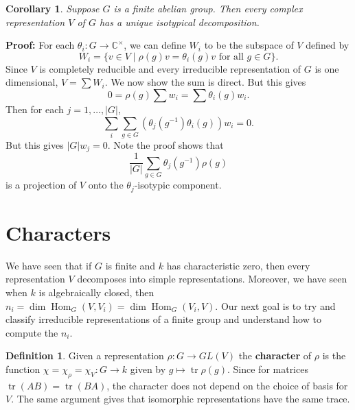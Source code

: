 \documentclass[12pt]{article}
\DeclareMathOperator{\tr}{tr}
\DeclareMathOperator{\Hom}{Hom}
\newtheorem{corollary}{Corollary}[section]
\theoremstyle{definition}
\newtheorem{definition}{Definition}[section]
\theoremstyle{remark}
\begin{document}
\begin{corollary}
	Suppose $G$ is a finite abelian group. Then every complex representation $V$ of $G$ has a unique isotypical decomposition.
\end{corollary}

\begin{adjustbox}{minipage = \columnwidth - 25.5pt, margin=1em, frame=1pt, margin=0em}
\textbf{Proof:} For each $\theta_i : G \to \mathbb{C}^{\times}$, we can define $W_i$ to be the subspace of $V$ defined by
\[
	W_i = \{v \in V \mid \rho(g)v = \theta_i(g)v \text{ for all } g \in G\}
.\]
Since $V$ is completely reducible and every irreducible representation of $G$ is one dimensional, $V = \sum W_i$. We now show the sum is direct. But this gives
\[
	0 = \rho(g) \sum w_i = \sum \theta_i (g) w_i
.\]
Then for each $j = 1, \ldots, |G|$,
\[
	\sum_{i} \sum_{g \in G} (\theta_j(g^{-1})\theta_i(g))w_i = 0
.\]
But this gives $|G| w_j = 0$. Note the proof shows that
\[
	\frac{1}{|G|} \sum_{g \in G} \theta_j(g^{-1}) \rho(g)
\]
is a projection of $V$ onto the $\theta_j$-isotypic component.
\end{adjustbox}

\newpage

\section{Characters}%
\label{sec:characters}

We have seen that if $G$ is finite and $k$ has characteristic zero, then every representation $V$ decomposes into simple representations. Moreover, we have seen when $k$ is algebraically closed, then $n_i = \dim \Hom_G(V, V_i) = \dim \Hom_G(V_i, V)$. Our next goal is to try and classify irreducible representations of a finite group and understand how to compute the $n_i$.

\begin{definition}
	Given a representation $\rho : G \to GL(V)$ the \textbf{character} of $\rho$ is the function $\chi = \chi_{\rho} = \chi_{V} : G \to k$ given by $g \mapsto \tr \rho(g)$. Since for matrices $\tr(AB) = \tr(BA)$, the character does not depend on the choice of basis for $V$. The same argument gives that isomorphic representations have the same trace.
\end{definition}
\end{document}
